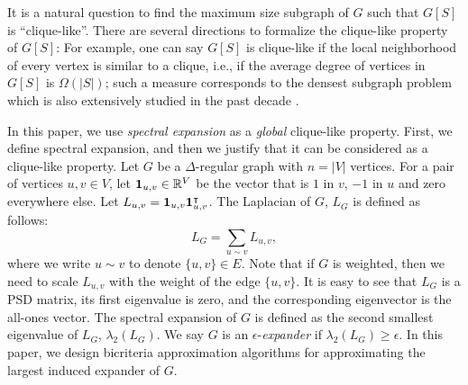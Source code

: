 \documentclass[11pt]{article}
\def\bone{{\bf 1}}
\def\R{\mathbb{R}}
\def\eps{\epsilon}
\begin{document}
It is a natural question to find the maximum size subgraph of $G$ such that $G[S]$ is ``clique-like''. There are several directions to formalize the clique-like property of $G[S]$: For example, one can say $G[S]$ is clique-like if the local neighborhood of every vertex is similar to a clique, i.e., if the average degree of vertices in $G[S]$ is $\Omega(|S|)$; such a measure corresponds to the densest subgraph problem which is also extensively studied in the past decade \cite{Cha00,Fei02,Kho04,BCCFV10}.

In this paper, we use \emph{spectral expansion}
as a \emph{global} clique-like property. First, we define spectral expansion, and then we justify that it can be considered as a clique-like property.
Let $G$ be a $\Delta$-regular graph with $n=|V|$ vertices.
For a pair of vertices $u,v\in V$, let $\bone_{u,v}\in \R^{V}$ be the vector that is $1$ in $v$, $-1$ in $u$ and zero everywhere else. Let $L_{u,v}=\bone_{u,v}\bone_{u,v}^\intercal$. The Laplacian of $G$, $L_G$ is defined as follows:
$$ L_G=\sum_{u\sim v} L_{u,v},$$
where we write $u\sim v$ to denote $\{u,v\}\in E$. 
Note that if $G$ is weighted, then we need to scale $L_{u,v}$ with the weight of the edge $\{u,v\}$.
It is easy to see that $L_G$ is a PSD matrix, its first eigenvalue is zero, and the corresponding eigenvector is the all-ones vector.
The spectral expansion of $G$ is defined as the second smallest eigenvalue  of $L_G$, $\lambda_2(L_G).$
We say $G$ is an $\eps$-\emph{expander} if $\lambda_2(L_G)\geq \eps$.
In this paper,  we design bicriteria approximation algorithms for approximating the largest induced  expander of $G$. 
\end{document}
